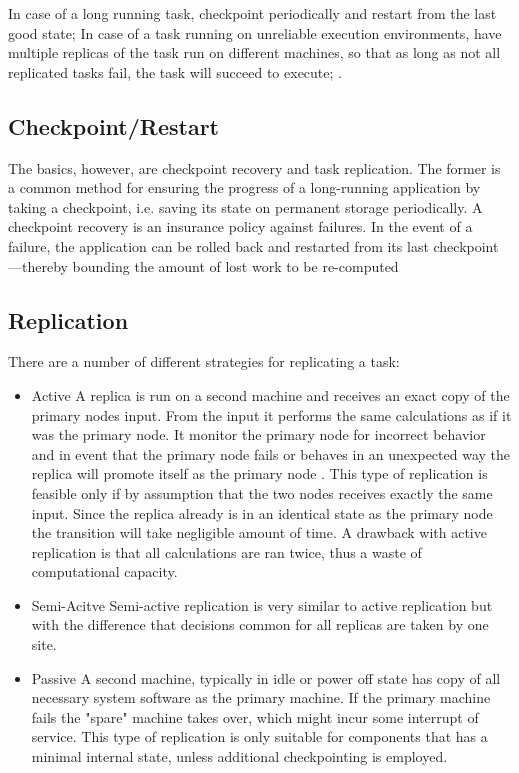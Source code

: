 \documentclass{cslthse-msc}
\begin{document}
In case of a long running task, checkpoint periodically and restart from the last good state;
In case of a task running on unreliable execution environments, have multiple replicas of the task run on different machines, so that as long as not all replicated tasks fail, the task will succeed to execute; \cite{gridWorkflow}.



\subsection{Checkpoint/Restart}

The basics, however, are checkpoint recovery and task replication. The former is a common method for ensuring the progress of a long-running application by taking a checkpoint, i.e. saving its state on permanent storage periodically. A checkpoint recovery is an insurance policy against failures. In the event of a failure, the application can be rolled back and restarted from its last checkpoint—thereby bounding the amount of lost work to be re-computed \cite{effTaskReplMobGrid}

\subsection{Replication}
There are a number of different strategies for replicating a task:
\begin{itemize}
\item Active A replica is run on a second machine and receives an exact copy of the primary nodes input. From the input it performs the same calculations as if it was the primary node. It monitor the primary node for incorrect behavior and in event that the primary node fails or behaves in an unexpected way the replica will promote itself as the primary node \cite{surveyFaultParallel}. This type of replication is feasible only if by assumption that the two nodes receives exactly the same input. Since the replica already is in an identical state as the primary node the transition will take negligible amount of time. A drawback with active replication is that all calculations are ran twice, thus a waste of computational capacity. 

\item Semi-Acitve Semi-active replication is very similar to active replication but with the difference that decisions common for all replicas are taken by one site. 

\item Passive A second machine, typically in idle or power off state has  copy of all necessary system software as the primary machine. If the primary machine fails the "spare" machine takes over, which might incur some interrupt of service. This type of replication is only suitable for components that has a minimal internal state, unless additional checkpointing is employed. 
\end{itemize}
\end{document}
